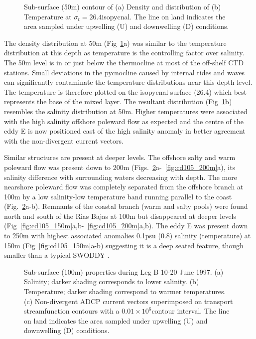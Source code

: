 \begin{figure}[ht]
\centering {}%
\caption{Sub-surface (50m) contour of (a) Density and distribution
of (b) Temperature at $\sigma_{t}=26.4$\dens isopycnal. The line
on land indicates the area sampled under upwelling (U) and
downwelling (D) conditions.} \label{fig:cd105_26.4}
\end{figure}
The density distribution at 50m (Fig~\ref{fig:cd105_26.4}a) was
similar to the temperature distribution at this depth as
temperature is the controlling factor over salinity. The 50m level
is in or just below the thermocline at most of the off-shelf CTD
stations. Small deviations in the pycnocline caused by internal
tides and waves can significantly contaminate the temperature
distributions near this depth level. The temperature is therefore
plotted on the isopycnal surface (26.4\dens) which best represents
the base of the mixed layer. The resultant distribution
(Fig~\ref{fig:cd105_26.4}b) resembles the salinity distribution at
50m. Higher temperatures were associated with the high salinity
offshore poleward flow as expected and the centre of the eddy E is
now positioned east of the high salinity anomaly in better
agreement with the non-divergent current vectors.


Similar structures are present at deeper levels. The offshore
salty and warm poleward flow was present down to 200m
(Figs.~\ref{fig:cd105_100m}a-~\ref{fig:cd105_200m}a), its salinity
difference with surrounding waters decreasing with depth. The more
nearshore poleward flow was completely separated from the offshore
branch at 100m by a low salinity-low temperature band running
parallel to the coast (Fig.~\ref{fig:cd105_100m}a-b). Remnants of
the coastal branch (warm and salty pools) were found north and
south of the Rias Bajas at 100m but disappeared at deeper levels
(Fig~\ref{fig:cd105_150m}a,b-~\ref{fig:cd105_200m}a,b). The eddy E
was present down to 250m with highest associated anomalies 0.1psu
(0.8\deg) salinity (temperature) at 150m
(Fig~\ref{fig:cd105_150m}a-b) suggesting it is a deep seated
feature, though smaller than a typical SWODDY \citep{Pingree92b}.



\begin{figure}[th]
\begin{widefig}{-.5cm}{-.7cm}
\centering {}%
 
\caption{Sub-surface (100m) properties during Leg B 10-20 June
1997. (a) Salinity; darker shading corresponds to lower salinity.
(b) Temperature; darker shading correspond to warmer temperatures.
(c) Non-divergent ADCP current vectors superimposed on transport
streamfunction contours with a $0.01\times 10^{6}$\tra contour
interval. The line on land indicates the area sampled under
upwelling (U) and downwelling (D) conditions.}
\label{fig:cd105_100m}\end{widefig}\end{figure}

